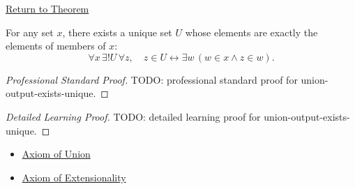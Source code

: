 \newpage
{}
\label{prf:union-output-exists-unique}

\begin{remark*}[Return]
\hyperref[thm:union-output-exists-unique]{Return to Theorem}
\end{remark*}

\begin{theorem*}
For any set $x$, there exists a unique set $U$ whose elements are exactly the
elements of members of $x$:
\[
  \forall x\,\exists! U\,\forall z,\quad
  z\in U\leftrightarrow \exists w\,(w\in x\wedge z\in w).
\]
\end{theorem*}

\begin{proof}[Professional Standard Proof]
\LRAProofBodyStart
TODO: professional standard proof for union-output-exists-unique.
\end{proof}

\begin{proof}[Detailed Learning Proof]
\LRAProofBodyStart
TODO: detailed learning proof for union-output-exists-unique.
\end{proof}

\begin{remark*}
\end{remark*}

\begin{dependencies}
\begin{itemize}
  \item \hyperref[ax:union]{Axiom of Union}
  \item \hyperref[ax:extensionality]{Axiom of Extensionality}
\end{itemize}
\end{dependencies}

\clearpage
